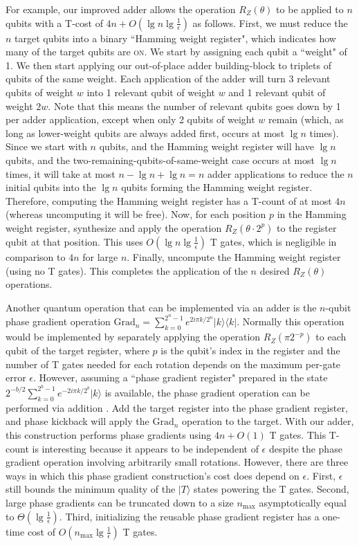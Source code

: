 \documentclass[twocolumn]{quantumarticle-customized}
\begin{document}
For example, our improved adder allows the operation $R_Z(\theta)$ to be applied to $n$ qubits with a T-cost of $4n + O(\lg n \lg \frac{1}{\epsilon})$ as follows.
First, we must reduce the $n$ target qubits into a binary ``Hamming weight register", which indicates how many of the target qubits are \textsc{on}.
We start by assigning each qubit a ``weight" of 1.
We then start applying our out-of-place adder building-block to triplets of qubits of the same weight.
Each application of the adder will turn 3 relevant qubits of weight $w$ into 1 relevant qubit of weight $w$ and 1 relevant qubit of weight $2w$.
Note that this means the number of relevant qubits goes down by 1 per adder application, except when only 2 qubits of weight $w$ remain (which, as long as lower-weight qubits are always added first, occurs at most $\lg n$ times).
Since we start with $n$ qubits, and the Hamming weight register will have $\lg n$ qubits, and the two-remaining-qubits-of-same-weight case occurs at most $\lg n$ times, it will take at most $n - \lg n + \lg n = n$ adder applications to reduce the $n$ initial qubits into the $\lg n$ qubits forming the Hamming weight register.
Therefore, computing the Hamming weight register has a T-count of at most $4n$ (whereas uncomputing it will be free).
Now, for each position $p$ in the Hamming weight register, synthesize and apply the operation $R_Z(\theta \cdot 2^p)$ to the register qubit at that position.
This uses $O(\lg n \lg \frac{1}{\epsilon})$ T gates, which is negligible in comparison to $4n$ for large $n$.
Finally, uncompute the Hamming weight register (using no T gates).
This completes the application of the $n$ desired $R_Z(\theta)$ operations.

Another quantum operation that can be implemented via an adder is the $n$-qubit phase gradient operation $\text{Grad}_n = \sum_{k=0}^{2^n-1} e^{2 i \pi k / 2^n} |k\rangle \langle k|$.
Normally this operation would be implemented by separately applying the operation $R_Z(\pi 2^{-p})$ to each qubit of the target register, where $p$ is the qubit's index in the register and the number of T gates needed for each rotation depends on the maximum per-gate error $\epsilon$.
However, assuming a ``phase gradient register" prepared in the state $2^{-b/2} \sum_{k=0}^{2^b-1} e^{-2 i \pi k / 2^b} |k\rangle$ is available, the phase gradient operation can be performed via addition \cite{Kitaev2002}.
Add the target register into the phase gradient register, and phase kickback will apply the $\text{Grad}_n$ operation to the target.
With our adder, this construction performs phase gradients using $4n + O(1)$ T gates.
This T-count is interesting because it appears to be independent of $\epsilon$ despite the phase gradient operation involving arbitrarily small rotations.
However, there are three ways in which this phase gradient construction's cost does depend on $\epsilon$.
First, $\epsilon$ still bounds the minimum quality of the $|T\rangle$ states powering the T gates.
Second, large phase gradients can be truncated down to a size $n_{\text{max}}$ asymptotically equal to $\Theta(\lg \frac{1}{\epsilon})$.
Third, initializing the reusable phase gradient register has a one-time cost of $O(n_{\text{max}} \lg \frac{1}{\epsilon})$ T gates.
\end{document}
